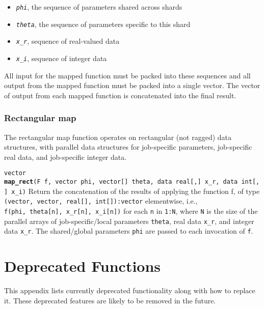 \documentclass[
  10pt,
]{book}
\begin{document}
\begin{itemize}
\item
  \emph{\texttt{phi}}, the sequence of parameters shared across shards
\item
  \emph{\texttt{theta}}, the sequence of parameters specific to this shard
\item
  \emph{\texttt{x\_r}}, sequence of real-valued data
\item
  \emph{\texttt{x\_i}}, sequence of integer data
\end{itemize}

All input for the mapped function must be packed into these sequences
and all output from the mapped function must be packed into a single
vector. The vector of output from each mapped function is
concatenated into the final result.

\hypertarget{rectangular-map}{%
\subsection{Rectangular map}\label{rectangular-map}}

The rectangular map function operates on rectangular (not ragged) data
structures, with parallel data structures for job-specific parameters,
job-specific real data, and job-specific integer data.


\texttt{vector} \textbf{\texttt{map\_rect}}\texttt{(F\ f,\ vector\ phi,\ vector{[}{]}\ theta,\ data\ real{[},{]}\ x\_r,\ data\ int{[},{]}\ x\_i)}\newline
Return the concatenation of the results of applying the function f, of
type \texttt{(vector,\ vector,\ real{[}{]},\ int{[}{]}):vector} elementwise, i.e.,
\texttt{f(phi,\ theta{[}n{]},\ x\_r{[}n{]},\ x\_i{[}n{]})} for each \texttt{n} in \texttt{1:N}, where \texttt{N} is
the size of the parallel arrays of job-specific/local parameters
\texttt{theta}, real data \texttt{x\_r}, and integer data \texttt{x\_r}. The shared/global
parameters \texttt{phi} are passed to each invocation of \texttt{f}.

\hypertarget{deprecated-functions}{%
\chapter{Deprecated Functions}\label{deprecated-functions}}

This appendix lists currently deprecated functionality along with how to
replace it. These deprecated features are likely to be removed in the future.
\end{document}
